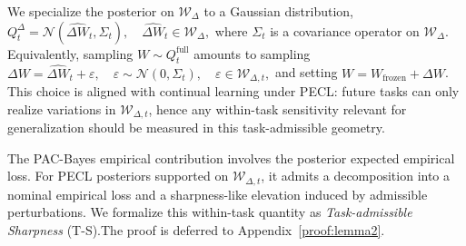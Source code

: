 \documentclass{article}
\theoremstyle{plain}
\theoremstyle{definition}
\theoremstyle{remark}
\begin{document}
We specialize the posterior on $\mathcal{W}_\Delta$ to a Gaussian distribution,
$
Q_t^\Delta = \mathcal{N}(\hat{\Delta W}_t,\Sigma_t),
\quad
\hat{\Delta W}_t \in \mathcal{W}_\Delta,
$
where $\Sigma_t$ is a covariance operator on $\mathcal{W}_\Delta$.
Equivalently, sampling $W\sim Q_t^{\mathrm{full}}$ amounts to sampling
$
\Delta W = \hat{\Delta W}_t + \varepsilon,
\quad
\varepsilon \sim \mathcal N(0,\Sigma_t),
\quad
\varepsilon \in \mathcal W_{\Delta,t},
$
and setting $W = W_{\mathrm{frozen}} + \Delta W$.
This choice is aligned with continual learning under PECL: future tasks can only realize variations in $\mathcal W_{\Delta,t}$, hence any within-task sensitivity relevant for generalization should be measured in this task-admissible geometry.


The PAC-Bayes empirical contribution involves the posterior expected empirical loss.
For PECL posteriors supported on $\mathcal W_{\Delta,t}$, it admits a decomposition into a nominal empirical loss and a sharpness-like elevation induced by admissible perturbations.
We formalize this within-task quantity as \emph{Task-admissible Sharpness} (T-S).The proof is deferred to Appendix~\ref{proof:lemma2}.


\end{document}
